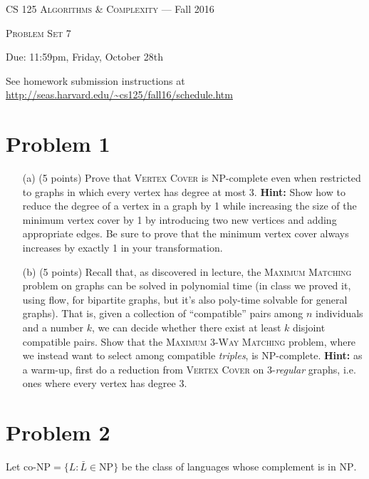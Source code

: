 \documentclass[12pt]{article}
\newcommand{\NP}{\mathrm{NP}}
\newcommand{\coNP}{\mbox{co-NP}}
\begin{document}
\thispagestyle{empty}

\begin{center}
{\Large \textsc{CS 125 Algorithms \& Complexity} --- Fall 2016}

\bigskip

{\Large \textsc{Problem Set 7}}

\smallskip

Due: 11:59pm, Friday, October 28th

\bigskip

{\footnotesize See homework submission instructions at \url{http://seas.harvard.edu/~cs125/fall16/schedule.htm}}
\end{center}


\section*{Problem 1} 

\begin{itemize}
\item[(a)] (5 points) Prove that \textsc{Vertex Cover} is $\NP$-complete even when restricted to graphs in which every vertex has degree at most 3.  \textbf{Hint:} Show how to  reduce the degree of a vertex in a graph by 1 while increasing the size of the minimum vertex cover by 1 by introducing two new vertices and adding appropriate edges.  Be sure to prove that the minimum vertex cover always increases by exactly 1 in your transformation.
\item[(b)] (5 points) Recall that, as discovered in lecture, the \textsc{Maximum Matching} problem on graphs can be solved in polynomial time (in class we proved it, using flow, for bipartite graphs, but it's also poly-time solvable for general graphs).  That is, given a collection of ``compatible'' pairs among $n$ individuals and a number $k$, we can decide whether there exist at least $k$ disjoint compatible pairs. Show that the \textsc{Maximum 3-Way Matching} problem, where we instead want to select among compatible {\em triples}, is $\NP$-complete. \textbf{Hint:} as a warm-up, first do a reduction from \textsc{Vertex Cover} on 3-{\em regular} graphs, i.e. ones where every vertex has degree 3.
\end{itemize}

\section*{Problem 2}

Let $\coNP=\{L: \bar{L} \in \NP\}$ be the class of languages whose complement is in $\NP$.
\end{document}
